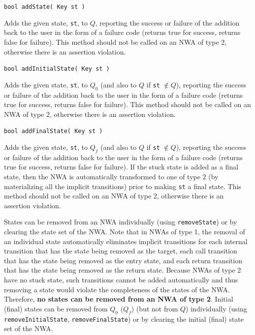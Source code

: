 \documentclass{llncs}
\begin{document}
\begin{description}

  \item\texttt{bool addState( Key st )}

    Adds the given state, \texttt{st}, to $Q$, reporting the success or failure of the addition back to the user in the form of a failure code (returns true for success, returns false for failure).  This method should not be called on an NWA of type 2, otherwise there is an assertion violation.

  \item\texttt{bool addInitialState( Key st )}

    Adds the given state, \texttt{st}, to $Q_0 $ (and also to $Q$ if \texttt{st} $\not\in Q$), reporting the success or failure of the addition back to the user in the form of a failure code (returns true for success, returns false for failure).  This method should not be called on an NWA of type 2, otherwise there is an assertion violation.

  \item\texttt{bool addFinalState( Key st )}

    Adds the given state, \texttt{st}, to $Q_f$ (and also to $Q$ if \texttt{st} $\not\in Q$), reporting the success or failure of the addition back to the user in the form of a failure code (returns true for success, returns false for failure).  If the stuck state is added as a final state, then the NWA is automatically transformed to one of type 2 (by materializing all the implicit transitions) prior to making \texttt{st} a final state.  This method should not be called on an NWA of type 2, otherwise there is an assertion violation. \\

\end{description}


States can be removed from an NWA individually (using \texttt{removeState}) or by clearing the state set of the NWA.  Note that in NWAs of type 1, the removal of an individual state automatically eliminates implicit transitions for each internal transition that has the state being removed as the target, each call transition that has the state being removed as the entry state, and each return transition that has the state being removed as the return state.  Because NWAs of type 2 have no stuck state, such transitions cannot be added automatically and thus removing a state would violate the completeness of the states of the NWA.  Therefore, \textbf{no states can be removed from an NWA of type 2}.  Initial (final) states can be removed from $Q_0 $ ($Q_f$) (but not from $Q$) individually (using \texttt{removeInitialState}, \texttt{removeFinalState}) or by clearing the initial (final) state set of the NWA. \\
\end{document}
